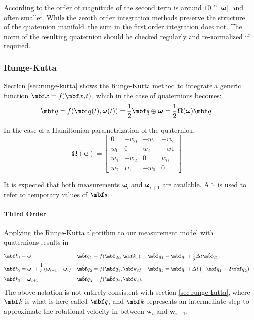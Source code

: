 \documentclass[10pt,a4paper]{article}
\newcommand{\mbs}[1]{{\boldsymbol{#1}}}
\numberwithin{equation}{section}
\begin{document}
According to \cite{joan_sola} the order of magnitude of the second term is around $10^{-6} ||\bm \omega ||$ and often smaller.
While the zeroth order integration methods preserve the structure of the quaternion manifold, the sum in the first order integration does not.
The norm of the resulting quaternion should be checked regularly and re-normalized if required.

\subsubsection{Runge-Kutta}
Section \ref{sec:runge-kutta} shows the Runge-Kutta method to integrate a generic function $\dot{\mbf x} = f(\mbf x, t)$, which in the case of quaternions becomes:
\begin{equation}
\dot{\mbf q} = f(\mbf q(t), \mbs \omega(t)) = \dfrac{1}{2} \mbf q \oplus \mbs \omega = \dfrac{1}{2} \mbs \Omega(\mbs \omega) {\mbf q}.
\end{equation}

In the case of a Hamiltonian parametrization of the quaternion,
\begin{equation}
\mbs \Omega(\mbs \omega) = \begin{bmatrix}
0 & -w_0 & -w_1 & -w_2 \\
w_0 & 0 & w_2 & -w1 \\
w_1 & -w_2 & 0 & w_0 \\
w_2 & w_1 & -w_0 & 0
\end{bmatrix}
\end{equation}

It is expected that both measurements $\mbs \omega_i$ and $\mbs \omega_{i+1}$ are available. A $\tilde{\cdot}$ is used to refer to temporary values of $\mbf q$.

\paragraph{Third Order}
Applying the Runge-Kutta algorithm to our measurement model with quaternions results in
\begin{align*}
\mbf k_1 &= \mbs \omega_i &
\dot{\mbf q}_1 &= f({\mbf q}_i , \mbf k_1) &
\tilde{\mbf q}_1 &= \mbf q_i +\dfrac{1}{2} \Delta t \dot{\mbf q}_1 \\
\mbf k_2 &= \mbs \omega_i + \dfrac{1}{2}\left( \mbs \omega_{i+1} - \mbs \omega_i \right) &
\dot{\mbf q}_2 &= f(\tilde{\mbf q}_1 , \mbf k_2) &
\tilde{\mbf q}_2 &= \mbf q_i + \Delta t \left(-\dot{\mbf q}_1 + 2 \dot{\mbf q}_2 \right) \\
\mbf k_3  &=  \mbs \omega_{i+1} &
\dot{\mbf q}_3 &= f(\tilde{\mbf q}_2 , \mbf k_3). &
\end{align*}
The above notation is not entirely consistent with section \ref{sec:runge-kutta}, where $\mbf k$ is what is here called $\dot{\mbf q}$, and $\mbf k$ represents an intermediate step to approximate the rotational velocity in between $\mbs w_i$ and $\mbs w_{i+1}$.
\end{document}
